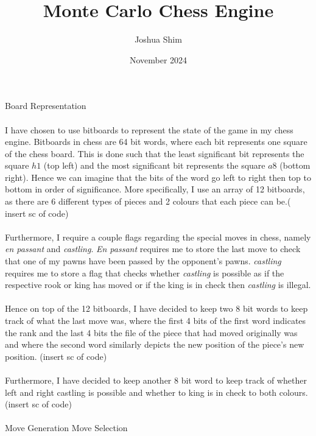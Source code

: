 \documentclass[12pt, letterpaper]{article}
\title{Monte Carlo Chess Engine}
\author{Joshua Shim}
\date{November 2024}
\begin{document}
\maketitle
\newpage
\LARGE{Board Representation}\\\\ \small
I have chosen to use bitboards to represent the state of the game in my chess engine. Bitboards in chess are 64 bit words, where each bit represents one square of the chess board. This is done such that the least significant bit represents the square $h1$ (top left) and the most significant bit represents the square $a8$ (bottom right). Hence we can imagine that the bits of the word go left to right then top to bottom in order of significance.
More specifically, I use an array of 12 bitboards, as there are 6 different types of pieces and 2 colours that each piece can be.( insert sc of code)\\\\ Furthermore, I require a couple flags regarding the special moves in chess, namely \textit{en passant} and \textit{castling}. \textit{En passant} requires me to store the last move to check that one of my pawns have been passed by the opponent's pawns. \textit{castling} requires me to store a flag that checks whether \textit{castling} is possible as if the respective rook or king has moved or if the king is in check then \textit{castling} is illegal.\\\\
Hence on top of the 12 bitboards, I have decided to keep two 8 bit words to keep track of what the last move was, where the first 4 bits of the first word indicates the rank and the last 4 bits the file of the piece that had moved originally was and where the second word similarly depicts the new position of the piece's new position. (insert sc of code)\\\\ Furthermore, I have decided to keep another 8 bit word to keep track of whether left and right castling is possible and whether to king is in check to both colours. (insert sc of code)\\\\
\newpage
\LARGE{Move Generation}
\newpage
\LARGE{Move Selection}
\end{document}
